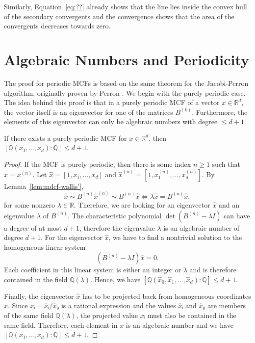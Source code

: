 Similarly,
Equation~\ref{eq:??} already shows that the line lies inside the convex hull of
the secondary convergents
and the convergence shows that the area of the convergents decreases towards zero.
\fi

\section{Algebraic Numbers and Periodicity}
\label{sec:mcf-periodic}

The proof for periodic MCFs is based on the same theorem for the Jacobi-Perron
algorithm, originally proven by Perron \cite{Perron07}.
We begin with the purely periodic case.
The idea behind this proof is that in a purely periodic MCF of a vector $x ∈ ℝ^d$,
the vector itself is an eigenvector for one of the matrices $B^{(k)}$.
Furthermore, the elements of this eigenvector can only be algebraic numbers with degree $≤ d+1$.

\begin{lemma}
  \label{lem:mdcf-purely-periodic}
  If there exists a purely periodic MCF for $x ∈ ℝ^d$,
  then $[ℚ(x₁, …, x_d) : ℚ] ≤ d+1$.
\end{lemma}

\begin{proof}
  If the MCF is purely periodic, then there is some index $n ≥ 1$ such that $x = x^{(n)}$.
  Let $\hat x = [1, x₁, …, x_d]$ and $\hat x^{(n)} = [1, x_1^{(n)}, …, x_d^{(n)}]$.
  By Lemma~\ref{lem:mdcf-wallis'},
  \[
    \hat x \sim B^{(n)} \hat x^{(n)} \sim B^{(n)} \hat x \iff λ \hat x = B^{(n)} \hat x,
  \]
  for some nonzero $λ ∈ ℝ$.
  Therefore, we are looking for an eigenvector $\hat x$ and an eigenvalue $λ$ of $B^{(n)}$.
  The characteristic polynomial $\det(B^{(n)} - λ I)$ can have a degree of at most $d+1$,
  therefore the eigenvalue $λ$ is an algebraic number of degree $d+1$.
  For the eigenvector $\hat x$, we have to find a nontrivial solution to the
  homogeneous linear system
  \[
    (B^{(n)} - λ I) \hat x = 0.
  \]
  Each coefficient in this linear system is either an integer or $λ$ and is
  therefore contained in the field $ℚ(λ)$.
  Hence, we have $[ℚ(\hat x_0, \hat x_1, …, \hat x_d) : ℚ] ≤ d+1$.

  Finally, the eigenvector $\hat x$ has to be projected back from homogeneous coordinates $x$.
  Since $xᵢ = \hat xᵢ / \hat x₀$ is a rational expression and the values $\hat xᵢ$ and $\hat x₀$ are members of the same field $ℚ(λ)$,
  the projected value $xᵢ$ must also be contained in the same field.
  Therefore, each element in $x$ is an algebraic number
  and we have $[ℚ(x₁, …, x_d) : ℚ] ≤ d+1$.
\end{proof}

